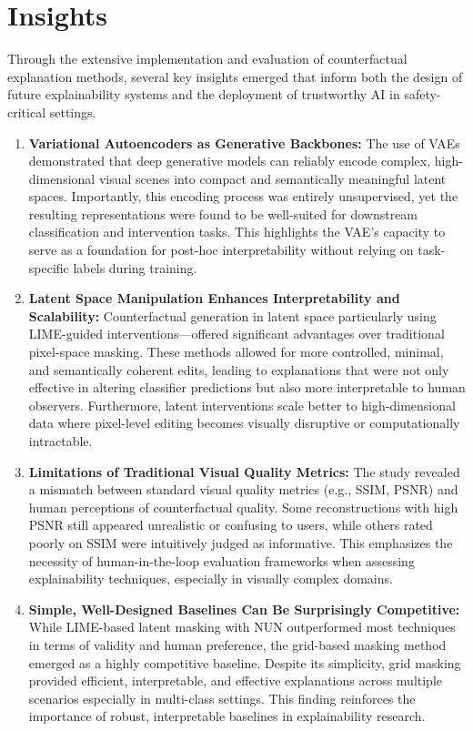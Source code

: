 \section{Insights}
Through the extensive implementation and evaluation of counterfactual explanation methods, several key insights emerged that inform both the design of future explainability systems and the deployment of trustworthy AI in safety-critical settings.
\begin{enumerate}
    \item \textbf{Variational Autoencoders as Generative Backbones:} 
    The use of VAEs demonstrated that deep generative models can reliably encode complex, high-dimensional visual scenes into compact and semantically meaningful latent spaces. Importantly, this encoding process was entirely unsupervised, yet the resulting representations were found to be well-suited for downstream classification and intervention tasks. This highlights the VAE's capacity to serve as a foundation for post-hoc interpretability without relying on task-specific labels during training.

    \item \textbf{Latent Space Manipulation Enhances Interpretability and Scalability:} 
    Counterfactual generation in latent space particularly using LIME-guided interventions—offered significant advantages over traditional pixel-space masking. These methods allowed for more controlled, minimal, and semantically coherent edits, leading to explanations that were not only effective in altering classifier predictions but also more interpretable to human observers. Furthermore, latent interventions scale better to high-dimensional data where pixel-level editing becomes visually disruptive or computationally intractable.

    \item \textbf{Limitations of Traditional Visual Quality Metrics:} 
    The study revealed a mismatch between standard visual quality metrics (e.g., SSIM, PSNR) and human perceptions of counterfactual quality. Some reconstructions with high PSNR still appeared unrealistic or confusing to users, while others rated poorly on SSIM were intuitively judged as informative. This emphasizes the necessity of human-in-the-loop evaluation frameworks when assessing explainability techniques, especially in visually complex domains.

    \item \textbf{Simple, Well-Designed Baselines Can Be Surprisingly Competitive:} 
    While LIME-based latent masking with NUN outperformed most techniques in terms of validity and human preference, the grid-based masking method emerged as a highly competitive baseline. Despite its simplicity, grid masking provided efficient, interpretable, and effective explanations across multiple scenarios especially in multi-class settings. This finding reinforces the importance of robust, interpretable baselines in explainability research.


\end{enumerate}
